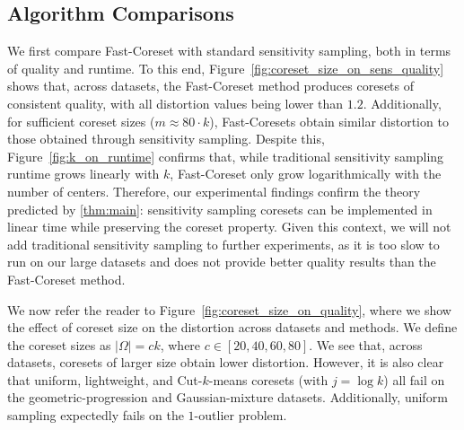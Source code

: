 \subsection{Algorithm Comparisons}
\label{ssec:alg_qualities}

We first compare Fast-Coreset with standard sensitivity sampling, both in terms of quality and runtime. 
To this end,
Figure~\ref{fig:coreset_size_on_sens_quality} shows that, across datasets, the Fast-Coreset method produces coresets of consistent quality, with all distortion
values being lower than $1.2$. 
Additionally, for sufficient coreset sizes ($m \approx 80\cdot k$), Fast-Coresets obtain similar distortion to those obtained
through sensitivity sampling. Despite this, Figure~\ref{fig:k_on_runtime} confirms that, while traditional sensitivity sampling runtime grows linearly with $k$,
Fast-Coreset only grow logarithmically with the number of centers. 
 Therefore, our experimental findings confirm the theory predicted by \cref{thm:main}:
sensitivity sampling coresets can be implemented in linear time while preserving the coreset property. Given this context, we will not add traditional
sensitivity sampling to further experiments, as it is too slow to run on our large datasets and does not provide better quality results than the Fast-Coreset
method.

We now refer the reader to Figure~\ref{fig:coreset_size_on_quality}, where we show the effect of coreset size on the distortion across datasets and methods.  We
define the coreset sizes as $|\Omega| = ck$, where $c \in [20, 40, 60, 80]$. We see that, across datasets, coresets of larger size obtain lower distortion.
However, it is also clear that uniform, lightweight, and Cut-$k$-means coresets (with $j=\log k$)  all fail on the geometric-progression and Gaussian-mixture datasets. Additionally, uniform sampling expectedly fails on the $1$-outlier problem.

